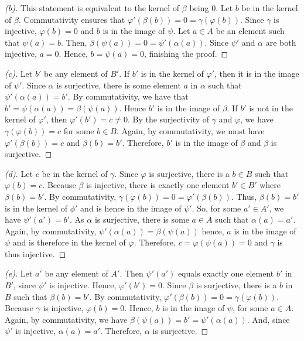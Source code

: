 \documentclass[10pt]{article}
\newenvironment{problem}[2][Problem]{\begin{trivlist}
		\item[\hskip \labelsep {\bfseries #1}\hskip \labelsep {\bfseries #2.}]}{\end{trivlist}}
\begin{document}
\begin{problem}{5.1}
\begin{proof}[(b)]
			This statement is equivalent to the kernel of $\beta$ being $0$. Let $b$ be in the kernel of $\beta$. Commutativity ensures that $\varphi'(\beta(b)) = 0 = \gamma(\varphi(b))$. Since $\gamma$ is injective, $\varphi(b) = 0$ and $b$ is in the image of $\psi$. Let $a \in A$ be an element such that $\psi(a) = b$. Then, $\beta(\psi(a)) = 0 = \psi'(\alpha(a))$. Since $\psi'$ and $\alpha$ are both injective, $a = 0$. Hence, $b = \psi(a) = 0$, finishing the proof.
		\end{proof}
		\begin{proof}[(c)]
			Let $b'$ be any element of $B'$. If $b'$ is in the kernel of $\varphi'$, then it is in the image of $\psi'$. Since $\alpha$ is surjective, there is some element $a$ in $\alpha$ such that $\psi'(\alpha(a)) = b'$. By commutativity, we have that $b' = \psi(\alpha(a)) = \beta(\psi(a))$. Hence $b'$ is in the image of $\beta$. If $b'$ is not in the kernel of $\varphi'$, then $\varphi'(b') = c \not = 0$. By the surjectivity of $\gamma$ and $\varphi$, we have $\gamma(\varphi(b)) = c$ for some $b \in B$. Again, by commutativity, we must have $\varphi'(\beta(b)) = c$ and $\beta(b) = b'$. Therefore, $b'$ is in the image of $\beta$ and $\beta$ is surjective.
		\end{proof}
		\begin{proof}[(d)]
			Let $c$ be in the kernel of $\gamma$. Since $\varphi$ is surjective, there is a $b \in B$ such that $\varphi(b) = c$. Because $\beta$ is injective, there is exactly one element $b' \in B'$ where $\beta(b)=b'$. By commutativity, $\gamma(\varphi(b)) = 0 = \varphi'(\beta(b))$. Thus, $\beta(b) = b'$ is in the kernel of $\phi'$ and is hence in the image of $\psi'$. So, for some $a'\in A'$, we have $\psi'(a')=b'$. As $\alpha$ is surjective, there is some $a \in A$ such that $\alpha(a) = a'$. Again, by commutativity, $\psi'(\alpha(a)) = \beta(\psi(a))$ hence, $a$ is in the image of $\psi$ and is therefore in the kernel of $\varphi$. Therefore, $c = \varphi(\psi(a)) = 0$ and $\gamma$ is thus injective.  
		\end{proof}
		\begin{proof}[(e)]
			Let $a'$ be any element of $A'$. Then $\psi'(a')$ equals exactly one element $b'$ in $B'$, since $\psi'$ is injective. Hence, $\varphi'(b') = 0$. Since $\beta$ is surjective, there is a $b$ in $B$ such that $\beta(b) = b'$. By commutativity, $\varphi'(\beta(b)) = 0 = \gamma(\varphi(b))$. Because $\gamma$ is injective, $\varphi(b) = 0$. Hence, $b$ is in the image of $\psi$, for some $a \in A$. Again, by commutativity, we have $\beta(\psi(a)) = b' = \psi'(\alpha(a))$. And, since $\psi'$ is injective, $\alpha(a) = a'$. Therefore, $\alpha$ is surjective.
		\end{proof}
	\end{problem}
	
\end{document}
